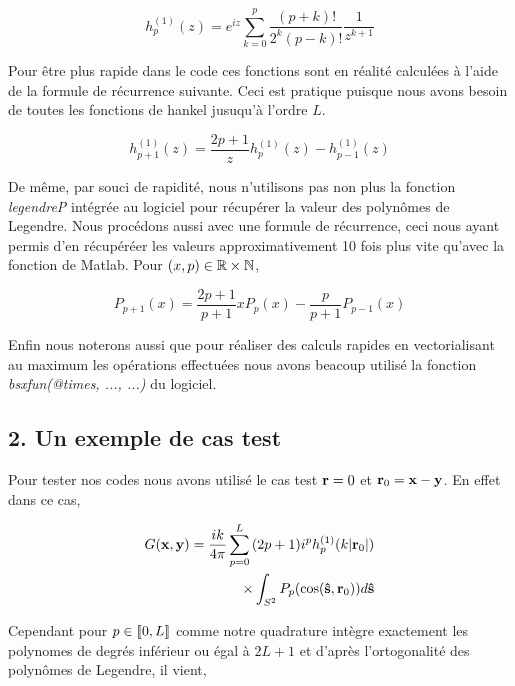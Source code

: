 \documentclass[10pt]{article}
\begin{document}
\begin{multicols}{2}
\begin{equation}
	h^{(1)}_{p}(z) = e^{iz}\sum_{k=0}^{p}{\frac{(p+k)!}{2^{k}(p-k)!}\frac{1}{z^{k+1}}}
\end{equation}

Pour être plus rapide dans le code ces fonctions sont en réalité calculées à l'aide de la formule de récurrence suivante. Ceci est pratique puisque nous avons besoin de toutes les fonctions de hankel jusuqu'à l'ordre $L$.

\begin{equation}
	h_{p+1}^{(1)}(z) =  \frac{2p+1}{z}h_{p}^{(1)}(z) - h_{p-1}^{(1)}(z) 
\end{equation}

De même, par souci de rapidité, nous n'utilisons pas non plus la fonction \textit{legendreP} intégrée au logiciel pour récupérer la valeur des polynômes de Legendre. Nous procédons aussi avec une formule de récurrence, ceci nous ayant permis d'en récupéréer les valeurs approximativement 10 fois plus vite qu'avec la fonction de Matlab. Pour $(x,p) \in \mathbb{R}\times\mathbb{N}$, 

\begin{equation}
	P_{p+1}(x) =  \frac{2p+1}{p+1}xP_{p}(x) - \frac{p}{p+1}P_{p-1}(x) 
\end{equation}


Enfin nous noterons aussi que pour réaliser des calculs rapides en vectorialisant au maximum les opérations effectuées nous avons beacoup utilisé la fonction \textit{bsxfun(@times, ..., ...)} du logiciel.





\vspace*{10pt}


\subsection*{2. Un exemple de cas test}

Pour tester nos codes nous avons utilisé le cas test ${\bf r} = 0$ et ${\bf r}_0 = {\bf x} - {\bf y}$. En effet dans ce cas,

\begin{equation}
\begin{split}
G({\bf x},{\bf y}) = \frac{ik}{4\pi}\sum_{p=0}^{L}{} (2p+1)i^{p}h_p^{(1)}(k|{\bf r}_0|)  \\
 \times\int_{S^{2}}P_p(\cos({\bf \hat{s}}, {\bf r}_0))d{\bf \hat{s}} 
\end{split}
\end{equation}

Cependant pour $p\in \llbracket 0,L \rrbracket $ comme notre quadrature intègre exactement les polynomes de degrés inférieur ou égal à $2L+1$ et d'après l'ortogonalité des polynômes de Legendre, il vient, 


\end{multicols}
\end{document}

